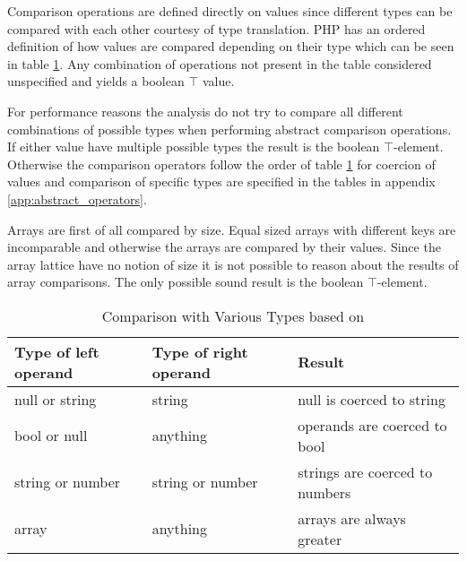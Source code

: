 Comparison operations are defined directly on values since different types can be compared with each other courtesy of type translation. PHP has an ordered definition of how values are compared depending on their type which can be seen in table \ref{tab:comparisons}. Any combination of operations not present in the table considered unspecified and yields a boolean $\top$ value. 

For performance reasons the analysis do not try to compare all different combinations of possible types when performing abstract comparison operations. If either value have multiple possible types the result is the boolean $\top$-element. Otherwise the comparison operators follow the order of table \ref{tab:comparisons} for coercion of values and comparison of specific types are specified in the tables in appendix \ref{app:abstract_operators}.

Arrays are first of all compared by size. Equal sized arrays with different keys are incomparable and otherwise the arrays are compared by their values. Since the array lattice have no notion of size it is not possible to reason about the results of array comparisons. The only possible sound result is the boolean $\top$-element.


\begin{table}[htbp]
\centering
\begin{tabular}{l|l||l}
Type of left operand & Type of right operand & Result \\\hline\hline
null or string & string & null is coerced to string \\\hline
bool or null & anything & operands are coerced to bool \\\hline
string or number & string or number & strings are coerced to numbers \\\hline
array & anything & arrays are always greater
\end{tabular}
\caption{Comparison with Various Types based on \protect{}}
\label{tab:comparisons}
\end{table}

